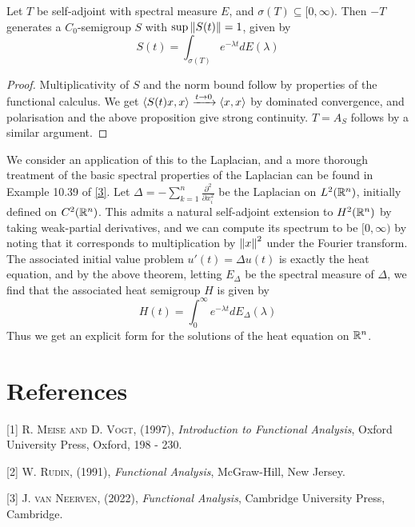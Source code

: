 \documentclass[10pt]{amsart}
\begin{document}
\begin{theorem}
    Let $T$ be self-adjoint with spectral measure $E$, and $\sigma(T) \subseteq [0, \infty)$. Then $-T$ generates a $C_0$-semigroup $S$ with $\sup\left\| S(t) \right\| = 1$, given by
    $$
        S(t) = \int_{\sigma(T)} e^{-\lambda t} dE(\lambda)
    $$
\end{theorem}
\begin{proof}
    Multiplicativity of $S$ and the norm bound follow by properties of the functional calculus. We get $\left\langle S(t)x, x \right\rangle \xrightarrow{t \to 0} \left\langle x, x \right\rangle$ by dominated convergence, and polarisation and the above proposition give strong continuity. $T = A_S$ follows by a similar argument.
\end{proof}
We consider an application of this to the Laplacian, and a more thorough treatment of the basic spectral properties of the Laplacian can be found in Example 10.39 of \hyperlink{jvn}{[3]}. Let $\Delta = -\sum_{k = 1}^n \frac{\partial^2}{\partial x_i^2}$ be the Laplacian on $L^2(\mathbb{R}^n)$, initially defined on $C^2(\mathbb{R}^n)$. This admits a natural self-adjoint extension to $H^2(\mathbb{R}^n)$ by taking weak-partial derivatives, and we can compute its spectrum to be $[0, \infty)$ by noting that it corresponds to multiplication by $\left\| x \right\|^2$ under the Fourier transform. The associated initial value problem $u'(t) = \Delta u(t)$ is exactly the heat equation, and by the above theorem, letting $E_\Delta$ be the spectral measure of $\Delta$, we find that the associated heat semigroup $H$ is given by
$$
    H(t) = \int_0^\infty e^{-\lambda t}dE_\Delta(\lambda)
$$
Thus we get an explicit form for the solutions of the heat equation on $\mathbb{R}^n$.








\section{References}



[1] \hypertarget{meisevogt}{\textsc{R. Meise and D. Vogt}, (1997), \emph{Introduction to Functional Analysis}, Oxford University Press, Oxford, 198 - 230.}

[2] \hypertarget{rudin}{\textsc{W. Rudin}, (1991), \emph{Functional Analysis}, McGraw-Hill, New Jersey.}

[3] \hypertarget{jvn}{\textsc{J. van Neerven}, (2022), \emph{Functional Analysis}, Cambridge University Press, Cambridge.}

\end{document}

